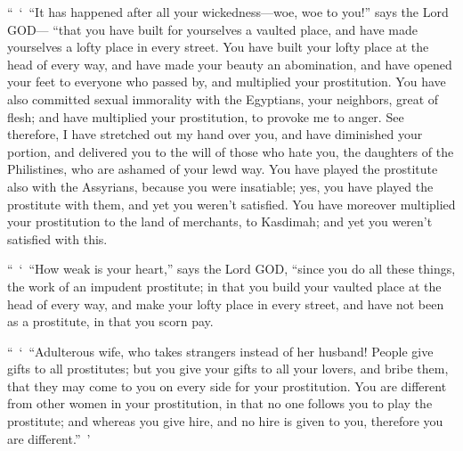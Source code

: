 \myverse{}“ ‘ “It has happened after all your wickedness—woe, woe to you!”
says the Lord GOD—
\myverse{}“that you have built for yourselves a vaulted place, and have made yourselves
a lofty place in every street.
\myverse{}You have built your lofty place at the head of every way, and have made your
beauty an abomination, and have opened your feet to everyone who passed by, and multiplied your prostitution.
\myverse{}You have also committed sexual immorality with the Egyptians, your neighbors,
great of flesh; and have multiplied your prostitution, to provoke me to anger.
\myverse{}See therefore, I have stretched out my hand over you, and have diminished
your portion, and delivered you to the will of those who hate you, the daughters of the Philistines, who
are ashamed of your lewd way.
\myverse{}You have played the prostitute also with the Assyrians, because you were
insatiable; yes, you have played the prostitute with them, and yet you weren’t satisfied.
\myverse{}You have moreover multiplied your prostitution to the land of merchants, to Kasdimah;
and yet you weren’t satisfied with this.

\myverse{}“ ‘ “How weak is your heart,” says the Lord GOD, “since you do
all these things, the work of an impudent prostitute;
\myverse{}in that you build your vaulted place at the head of every way, and make your
lofty place in every street, and have not been as a prostitute, in that you scorn pay.

\myverse{}“ ‘ “Adulterous wife, who takes strangers instead of her husband!
\myverse{}People give gifts to all prostitutes; but you give your gifts to all your
lovers, and bribe them, that they may come to you on every side for your prostitution.
\myverse{}You are different from other women in your prostitution, in that no one follows
you to play the prostitute; and whereas you give hire, and no hire is given to you, therefore you are
different.” ’

